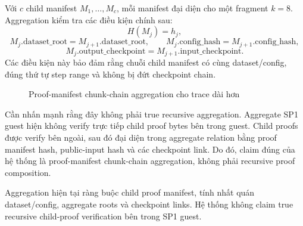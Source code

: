 \documentclass[12pt,a4paper,oneside]{report}
\begin{document}
Với \(c\) child manifest \(M_1,\ldots,M_c\), mỗi manifest đại diện cho một fragment \(k=8\). Aggregation kiểm tra các điều kiện chính sau:
\[
H(M_j) = h_j,
\]
\[
M_j.\text{dataset\_root} = M_{j+1}.\text{dataset\_root},
\qquad
M_j.\text{config\_hash} = M_{j+1}.\text{config\_hash},
\]
\[
M_j.\text{output\_checkpoint}
=
M_{j+1}.\text{input\_checkpoint}.
\]
Các điều kiện này bảo đảm rằng chuỗi child manifest có cùng dataset/config, đúng thứ tự step range và không bị đứt checkpoint chain.

\begin{figure}[H]
\centering
{}
\caption{Proof-manifest chunk-chain aggregation cho trace dài hơn}
\end{figure}

Cần nhấn mạnh rằng đây không phải true recursive aggregation. Aggregate SP1 guest hiện không verify trực tiếp child proof bytes bên trong guest. Child proofs được verify bên ngoài, sau đó đại diện trong aggregate relation bằng proof manifest hash, public-input hash và các checkpoint link. Do đó, claim đúng của hệ thống là proof-manifest chunk-chain aggregation, không phải recursive proof composition.

\begin{warningbox}
Aggregation hiện tại ràng buộc child proof manifest, tính nhất quán dataset/config, aggregate roots và checkpoint links. Hệ thống không claim true recursive child-proof verification bên trong SP1 guest.
\end{warningbox}
\end{document}
